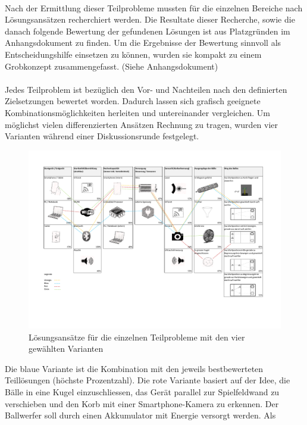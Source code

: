 \\
Nach der Ermittlung dieser Teilprobleme mussten für die einzelnen Bereiche nach Lösungsansätzen
recherchiert werden. Die Resultate dieser Recherche, sowie die danach folgende Bewertung der
gefundenen Lösungen ist aus Platzgründen im Anhangsdokument zu finden. Um die Ergebnisse der Bewertung
sinnvoll als Entscheidungshilfe einsetzen zu können, wurden sie kompakt zu einem Grobkonzept
zusammengefasst. (Siehe Anhangsdokument)\\
\\
Jedes Teilproblem ist bezüglich den Vor- und Nachteilen nach den definierten Zielsetzungen
bewertet worden. Dadurch lassen sich grafisch geeignete Kombinationsmöglichkeiten herleiten und
untereinander vergleichen. Um möglichst vielen differenzierten Ansätzen Rechnung zu tragen,
wurden vier Varianten während einer Diskussionsrunde festgelegt.
\newpage
\begin{landscape}
	\begin{figure}[t]
		\centering
		\includegraphics[scale=0.8,clip,trim= 15mm 37mm 21mm 19mm]
		{Enddokumentation/Varianten/Bilder/Grobkonzept.pdf}
		\caption{Lösungsansätze für die einzelnen Teilprobleme mit den vier gewählten Varianten}
		\label{fig:Grobkonzept}
	\end{figure}
\end{landscape}
\noindent Die blaue Variante ist die Kombination mit den jeweils bestbewerteten Teillösungen (höchste Prozentzahl).
 Die rote Variante basiert auf der Idee, die Bälle in eine Kugel einzuschliessen,
das Gerät parallel zur Spielfeldwand zu verschieben und den Korb mit einer Smartphone-Kamera zu
erkennen. Der Ballwerfer soll durch einen Akkumulator mit Energie versorgt werden. Als
